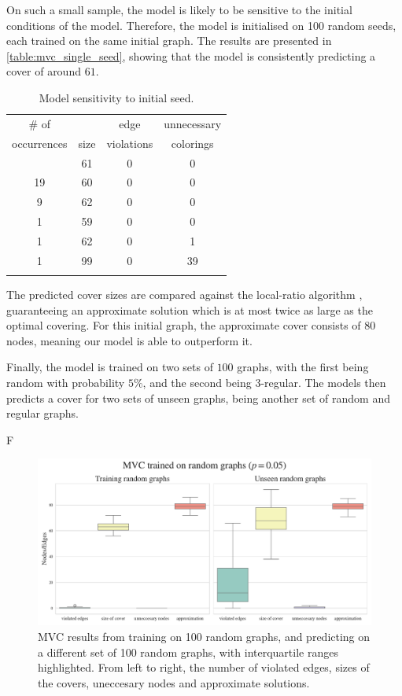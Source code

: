 On such a small sample, the model is likely to be sensitive to the initial conditions of the model.
Therefore, the model is initialised on 100 random seeds, each trained on the same initial graph.
The results are presented in \autoref{table:mvc_single_seed}, showing that the model is consistently predicting a cover of around $61$.

\begin{table}[h!]
\centering
\caption{Model sensitivity to initial seed.}
\begin{tabular}{c|c|c|c}
    \toprule
    \# of & & edge & unnecessary \\
    occurrences & size & violations & colorings \\
    \colrule
    69 & 61 & 0 & 0 \\
    19 & 60 & 0 & 0 \\
    9 & 62 & 0 & 0 \\
    1 & 59 & 0 & 0 \\
    1 & 62 & 0 & 1 \\
    1 & 99 & 0 & 39 \\
    \botrule
\end{tabular}
\label{table:mvc_single_seed}
\end{table}

The predicted cover sizes are compared against the local-ratio algorithm \cite{local_ratio_approx}, guaranteeing an approximate solution which is at most twice as large as the optimal covering.
For this initial graph, the approximate cover consists of $80$ nodes, meaning our model is able to outperform it.

Finally, the model is trained on two sets of $100$ graphs, with the first being random with probability $5\%$, and the second being $3$-regular.
The models then predicts a cover for two sets of unseen graphs, being another set of random and regular graphs.

F
\begin{figure}[h]
    \centering
    \includegraphics[width=\linewidth]{Project2TSP/_src/figures/mvc_random_boxes.pdf}
    \caption{MVC results from training on 100 random graphs, and predicting on a different set of 100 random graphs, with interquartile ranges highlighted. From left to right, the number of violated edges, sizes of the covers, uneccesary nodes and approximate solutions.}
    \label{fig:mvc_random_to_random}
\end{figure}

